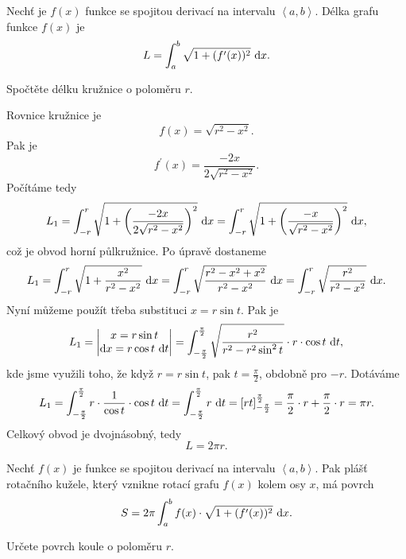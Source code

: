 \begin{pozn}
Nechť je $f(x)$ funkce se spojitou derivací na intervalu $\left<  a,b \right> $. Délka
grafu funkce $f(x)$ je
$$L=\int_a^b \sqrt{1+(f^\prime(x))^2}\, \mathop{}\!\mathrm{d} x. $$
\end{pozn}

\begin{priklad}
Spočtěte délku kružnice o poloměru $r$.
\end{priklad}

\begin{reseni}
Rovnice kružnice je
$$
    f(x) = \sqrt{r^2-x^2}.
$$
Pak je
$$
    f^\prime(x) = \frac{-2x}{2 \sqrt{r^2 - x^2}}.
$$
Počítáme tedy
$$
    L_1 = \int _{-r}^{r} \sqrt{1+\left(\frac{-2x}{2 \sqrt{r^2 - x^2}}\right)^2}\, \mathop{}\!\mathrm{d} x = \int _{-r}^{r} \sqrt{1+\left (\frac{-x}{\sqrt{r^2 - x^2}}\right)^2}\, \mathop{}\!\mathrm{d} x,
$$
což je obvod horní půlkružnice.
Po úpravě dostaneme
$$
    L_1 = \int _{-r}^{r} \sqrt{1+\frac{x^2}{r^2-x^2}}\, \mathop{}\!\mathrm{d} x = \int _{-r}^{r} \sqrt{\frac{r^2 - x^2 + x^2}{r^2-x^2}}\, \mathop{}\!\mathrm{d} x = \int _{-r}^{r} \sqrt{\frac{r^2}{r^2-x^2}}\, \mathop{}\!\mathrm{d} x.
$$
Nyní můžeme použít třeba substituci $x=r\sin t$. Pak je
$$
    L_1 = \begin{vmatrix}
	x=r\sin t \\
	\mathop{}\!\mathrm{d} x = r \cos t \, \mathop{}\!\mathrm{d} t
    \end{vmatrix} = \int_{-\frac{\pi}{2}}^\frac{\pi }{2} \sqrt{\frac{r^2}{r^2-r^2\sin^2 t}}\cdot r\cdot \cos t \, \mathop{}\!\mathrm{d} t,
$$
kde jsme využili toho, že když $r=r \sin t$, pak $t = \frac{\pi}{2}$, obdobně pro $-r$. Dotáváme
$$
    L_1 = \int_{-\frac{\pi}{2}}^\frac{\pi }{2}r \cdot \frac{1}{ \cos t} \cdot \cos t \, \mathop{}\!\mathrm{d} t = \int_{-\frac{\pi}{2}}^\frac{\pi }{2} r \, \mathop{}\!\mathrm{d} t = \left [ rt \right ]_{-\frac{\pi }{2}}^\frac{\pi }{2} = \frac{\pi}{2} \cdot r + \frac{\pi }{2}\cdot r =\pi r.
$$
Celkový obvod je dvojnásobný, tedy
$$
L = 2\pi r.
$$
\end{reseni}

\begin{pozn}
    Nechť $f(x)$ je funkce se spojitou derivací na intervalu $\left<  a,b \right> .$
    Pak plášť rotačního kužele, který vznikne rotací grafu $f(x)$ kolem osy $x$, má
   povrch
  $$S=2\pi\int_a^b f(x)\cdot \sqrt{1+(f^\prime(x))^2}\, \mathop{}\!\mathrm{d} x. $$
\end{pozn}

\begin{priklad}
Určete povrch koule o poloměru $r$.
\end{priklad}

